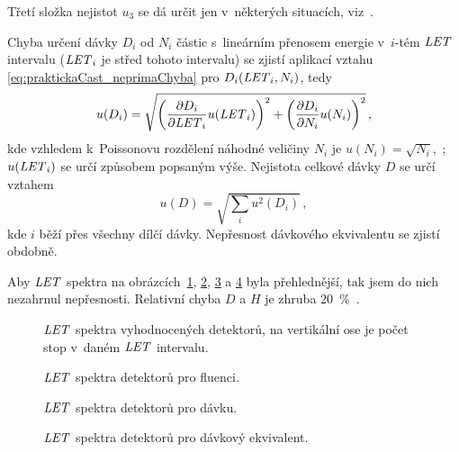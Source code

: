 Třetí složka nejistot $u_3$ se dá určit jen v~některých situacích, viz~\cite{nejistoty}.

Chyba určení dávky $D_i$ od $N_i$ částic s~lineárním přenosem energie v~$i$-tém $\mathit{LET}$ intervalu ($\mathit{LET}_i$ je střed tohoto intervalu) se zjistí aplikací vztahu \eqref{eq:praktickaCast_neprimaChyba} pro $D_i(\mathit{LET}_i,N_i)$, tedy 
\begin{equation}
  u(D_i)=\sqrt{\left(\frac{\partial D_i}{\partial\mathit{LET}_i}u(\mathit{LET}_i)\right)^2+\left(\frac{\partial D_i}{\partial N_i}u(N_i)\right)^2}\,,
  \label{eq:praktickaCast_chybaDavka}
\end{equation}
kde vzhledem k~Poissonovu rozdělení náhodné veličiny $N_i$ je $u(N_i)=\sqrt{N_i}$,~\cite{thesisKPBrabcova}; $u(\mathit{LET}_i)$ se určí způsobem popsaným výše. Nejistota celkové dávky $D$ se určí vztahem
\begin{equation}
  u(D)=\sqrt{\sum_i u^2(D_i)}\,,
  \label{eq:praktickaCast_chybaCelkDavka}
\end{equation}
kde $i$ běží přes všechny dílčí dávky. Nepřesnost dávkového ekvivalentu se zjistí obdobně.

Aby $\mathit{LET}$ spektra na obrázcích~\ref{fig:praktickaCast_LETcetnost}, \ref{fig:praktickaCast_LETfluence}, \ref{fig:praktickaCast_LETdavka} a \ref{fig:praktickaCast_LETdavkEkvivalent} byla přehlednější, tak jsem do nich nezahrnul nepřesnosti. Relativní chyba $D$ a $H$ je zhruba 20~\%~\cite{nejistoty}.
\begin{figure}[H]
  \centering
	\centering
	
	\caption{$\mathit{LET}$ spektra vyhodnocených detektorů, na vertikální ose je počet stop v~daném $\mathit{LET}$ intervalu.}
	\label{fig:praktickaCast_LETcetnost}
\end{figure}
\begin{figure}[H]
  \centering
	\centering
	
	\caption{$\mathit{LET}$ spektra detektorů pro fluenci.}
	\label{fig:praktickaCast_LETfluence}
\end{figure}
\begin{figure}[H]
  \centering
	\centering
	
	\caption{$\mathit{LET}$ spektra detektorů pro dávku.}
	\label{fig:praktickaCast_LETdavka}
\end{figure}
\begin{figure}[H]
  \centering
	\centering
	
	\caption{$\mathit{LET}$ spektra detektorů pro dávkový ekvivalent.}
	\label{fig:praktickaCast_LETdavkEkvivalent}
\end{figure}
